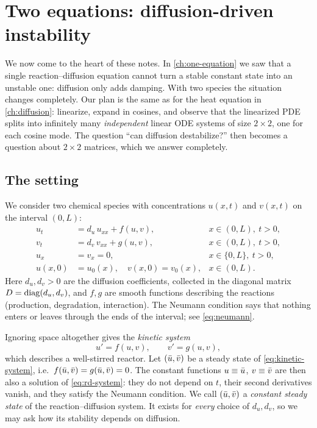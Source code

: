 \chapter{Two equations: diffusion-driven instability}\label{ch:turing}

We now come to the heart of these notes. In \cref{ch:one-equation} we saw that a
single reaction--diffusion equation cannot turn a stable constant state into an
unstable one: diffusion only adds damping. With two species the situation changes
completely. Our plan is the same as for the heat equation in \cref{ch:diffusion}:
linearize, expand in cosines, and observe that the linearized PDE splits into
infinitely many \emph{independent} linear ODE systems of size $2\times2$, one for
each cosine mode. The question ``can diffusion destabilize?'' then becomes a
question about $2\times 2$ matrices, which we answer completely.

\section{The setting}\label{sec:turing-setting}

We consider two chemical species with concentrations $u(x,t)$ and $v(x,t)$ on the
interval $(0,L)$:
\begin{equation}\label{eq:rd-system}
\begin{aligned}
  u_t &= d_u\, u_{xx} + f(u,v), & x\in(0,L),\ t>0,\\
  v_t &= d_v\, v_{xx} + g(u,v), & x\in(0,L),\ t>0,\\
  u_x &= v_x = 0, & x\in\{0,L\},\ t>0,\\
  u(x,0) &= u_0(x),\quad v(x,0)=v_0(x), & x\in(0,L).
\end{aligned}
\end{equation}
Here $d_u,d_v>0$ are the diffusion coefficients, collected in the diagonal matrix
$D=\operatorname{diag}(d_u,d_v)$, and $f,g$ are smooth functions describing the reactions
(production, degradation, interaction). The Neumann condition says that nothing
enters or leaves through the ends of the interval; see \eqref{eq:neumann}.

Ignoring space altogether gives the \emph{kinetic system}
\begin{equation}\label{eq:kinetic-system}
  u' = f(u,v),\qquad v' = g(u,v),
\end{equation}
which describes a well-stirred reactor. Let $(\bar u,\bar v)$ be a steady state of
\eqref{eq:kinetic-system}, i.e.\ $f(\bar u,\bar v)=g(\bar u,\bar v)=0$. The constant functions
$u\equiv\bar u$, $v\equiv\bar v$ are then also a solution of \eqref{eq:rd-system}: they do
not depend on $t$, their second derivatives vanish, and they satisfy the Neumann
condition. We call $(\bar u,\bar v)$ a \emph{constant steady state} of the
reaction--diffusion system. It exists for \emph{every} choice of $d_u,d_v$, so we may
ask how its stability depends on diffusion.

